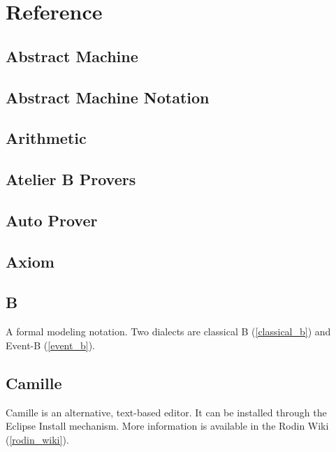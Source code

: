 \chapter{Reference}
\label{reference}



\section{Abstract Machine}
\label{abstract_machine}

\section{Abstract Machine Notation}
\label{abstract_machine_notation}

\section{Arithmetic}
\label{arithmetic}

\section{Atelier B Provers}
\label{atelier_b_provers}

\section{Auto Prover}
\label{auto_prover}

\section{Axiom}
\label{axiom}

\section{B}
\label{b}

A formal modeling notation.  Two dialects are classical B (\ref{classical_b}) and Event-B (\ref{event_b}).

\section{Camille}
\label{camille}

Camille is an alternative, text-based editor.  It can be installed through the Eclipse Install mechanism.  More information is available in the Rodin Wiki (\ref{rodin_wiki}).

